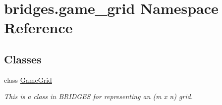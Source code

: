 \hypertarget{namespacebridges_1_1game__grid}{}\section{bridges.\+game\+\_\+grid Namespace Reference}
\label{namespacebridges_1_1game__grid}
\subsection*{Classes}
\begin{DoxyCompactItemize}
\item 
class \hyperlink{classbridges_1_1game__grid_1_1_game_grid}{Game\+Grid}
\begin{DoxyCompactList}\small\item\em This is a class in B\+R\+I\+D\+G\+ES for representing an (m x n) grid. \end{DoxyCompactList}\end{DoxyCompactItemize}
